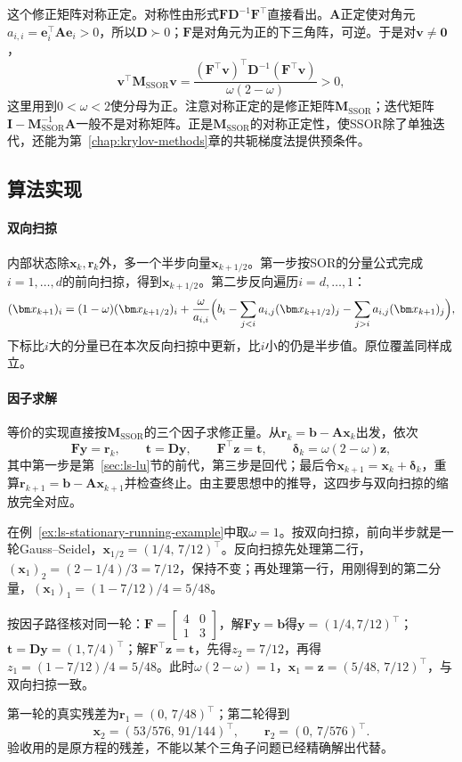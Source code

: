 这个修正矩阵对称正定。对称性由形式$\bm F\bm D^{-1}\bm F^\top$直接看出。$\bm A$正定使对角元$a_{i,i}=\bm e_i^\top\bm A\bm e_i>0$，所以$\bm D\succ0$；$\bm F$是对角元为正的下三角阵，可逆。于是对$\bm v\neq\bm0$，
\[
\bm v^\top\bm M_{\mathrm{SSOR}}\bm v=\frac{(\bm F^\top\bm v)^\top\bm D^{-1}(\bm F^\top\bm v)}{\omega(2-\omega)}>0 ,
\]
这里用到$0<\omega<2$使分母为正。注意对称正定的是修正矩阵$\bm M_{\mathrm{SSOR}}$；迭代矩阵$\bm I-\bm M_{\mathrm{SSOR}}^{-1}\bm A$一般不是对称矩阵。正是$\bm M_{\mathrm{SSOR}}$的对称正定性，使SSOR除了单独迭代，还能为第~\ref{chap:krylov-methods}章的共轭梯度法提供预条件。

\subsection{算法实现}

\paragraph{双向扫掠}
内部状态除$\bm x_k,\bm r_k$外，多一个半步向量$\bm x_{k+1/2}$。第一步按SOR的分量公式完成$i=1,\ldots,d$的前向扫掠，得到$\bm x_{k+1/2}$。第二步反向遍历$i=d,\ldots,1$：
\[
(\bm x_{k+1})_i=(1-\omega)(\bm x_{k+1/2})_i+\frac{\omega}{a_{i,i}}\Bigl(b_i-\sum_{j<i}a_{i,j}(\bm x_{k+1/2})_j-\sum_{j>i}a_{i,j}(\bm x_{k+1})_j\Bigr),
\]
下标比$i$大的分量已在本次反向扫掠中更新，比$i$小的仍是半步值。原位覆盖同样成立。

\paragraph{因子求解}
等价的实现直接按$\bm M_{\mathrm{SSOR}}$的三个因子求修正量。从$\bm r_k=\bm b-\bm A\bm x_k$出发，依次
\[
\bm F\bm y=\bm r_k,\qquad \bm t=\bm D\bm y,\qquad \bm F^\top\bm z=\bm t,\qquad \bm\delta_k=\omega(2-\omega)\bm z ,
\]
其中第一步是第~\ref{sec:ls-lu}节的前代，第三步是回代；最后令$\bm x_{k+1}=\bm x_k+\bm\delta_k$，重算$\bm r_{k+1}=\bm b-\bm A\bm x_{k+1}$并检查终止。由主要思想中的推导，这四步与双向扫掠的缩放完全对应。

\begin{example}[SSOR迭代的前两轮]
\label{ex:ls-ssor-two-sweeps}
在例~\ref{ex:ls-stationary-running-example}中取$\omega=1$。按双向扫掠，前向半步就是一轮Gauss--Seidel，$\bm x_{1/2}=(1/4,\,7/12)^\top$。反向扫掠先处理第二行，$(\bm x_1)_2=(2-1/4)/3=7/12$，保持不变；再处理第一行，用刚得到的第二分量，$(\bm x_1)_1=(1-7/12)/4=5/48$。

按因子路径核对同一轮：$\bm F=\left[\begin{smallmatrix}4&0\\1&3\end{smallmatrix}\right]$，解$\bm F\bm y=\bm b$得$\bm y=(1/4,7/12)^\top$；$\bm t=\bm D\bm y=(1,7/4)^\top$；解$\bm F^\top\bm z=\bm t$，先得$z_2=7/12$，再得$z_1=(1-7/12)/4=5/48$。此时$\omega(2-\omega)=1$，$\bm x_1=\bm z=(5/48,\,7/12)^\top$，与双向扫掠一致。

第一轮的真实残差为$\bm r_1=(0,\,7/48)^\top$；第二轮得到
\[
 \bm x_2=(53/576,\,91/144)^\top,\qquad \bm r_2=(0,\,7/576)^\top .
\]
验收用的是原方程的残差，不能以某个三角子问题已经精确解出代替。
\end{example}

